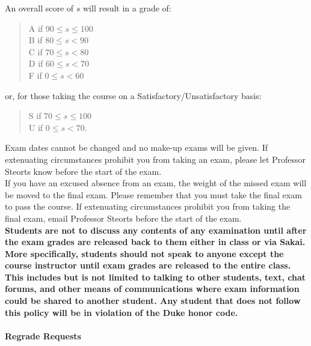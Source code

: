 \documentclass[11pt]{article}
\begin{document}
An overall score of $s$ will result in a grade of:
\begin{quote}
A if $90\leq s\leq 100$ \\
B if $80\leq s < 90$ \\
C if $70\leq s < 80$ \\
D if $60\leq s < 70$ \\
F if $0\leq s < 60$
\end{quote}
or, for those taking the course on a Satisfactory/Unsatisfactory basis:
\begin{quote}
S if $70\leq s\leq 100$ \\
U if $0\leq s < 70$.
\end{quote}


Exam dates cannot be changed and no make-up exams will be given. If extenuating circumstances prohibit you from taking an exam, please let Professor Steorts know before the start of the exam.\\

If you have an excused absence from an exam, the weight of the missed exam will be moved to the final exam. Please remember that you must take the final exam to pass the course. If extenuating circumstances prohibit you from taking the final exam, email Professor Steorts before the start of the exam. \\

\textbf{Students are not to discuss any contents of any examination until after the exam grades are released back to them either in class or via Sakai. More specifically, students should not speak to anyone except the course instructor until exam grades are released to the entire class. This includes but is not limited to talking to other students, text, chat forums, and other means of communications where exam information could be shared to another student. Any student that does not follow this policy will be in violation of the Duke honor code.}\\

\paragraph{Regrade Requests}
\end{document}
